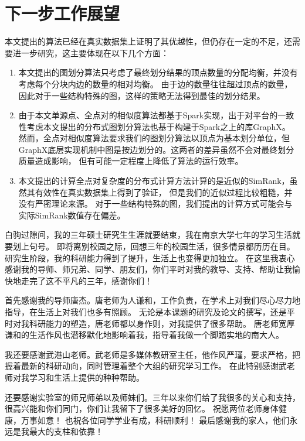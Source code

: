 \documentclass[master]{njuthesis}
\begin{document}
\section{下一步工作展望}
本文提出的算法已经在真实数据集上证明了其优越性，但仍存在一定的不足，还需要进一步研究，这主要体现在以下几个方面：
\begin{enumerate}
 \item 本文提出的图划分算法只考虑了最终划分结果的顶点数量的分配均衡，并没有考虑每个分块内边的数量的相对均衡。
 由于边的数量往往超过顶点的数量，因此对于一些结构特殊的图，这样的策略无法得到最佳的划分结果。
 \item 由于本文单源点、全点对的相似度算法都基于Spark实现，出于对平台的一致性考虑本文提出的分布式图划分算法也基于构建于Spark之上的库GraphX。
 然而，全点对相似度算法要求我们的图划分算法以顶点为基本划分单位，但GraphX底层实现机制中图是按边划分的。这两者的差异虽然不会对最终划分质量造成影响，
 但有可能一定程度上降低了算法的运行效率。
 \item 本文提出的计算全点对复杂度的分布式计算方法计算的是近似的SimRank，虽然其有效性在真实数据集上得到了验证，
 但是我们的近似过程比较粗糙，并没有严密理论来源。 对于一些结构特殊的图，我们提出的计算方式可能会与实际SimRank数值存在偏差。
 
\end{enumerate}



\begin{acknowledgement}
白驹过隙间，我的三年硕士研究生生涯就要结束，我在南京大学七年的学习生活就要划上句号。
即将离别校园之际，回想三年的校园生活，很多情景都历历在目。
研究生阶段，我的科研能力得到了提升，生活上也变得更加独立。
在这里我衷心感谢我的导师、师兄弟、同学、朋友们，你们平时对我的教导、支持、帮助让我愉快地走完了这不平凡的三年，感谢你们！

首先感谢我的导师唐杰。唐老师为人谦和，工作负责，在学术上对我们尽心尽力地指导，在生活上对我们也多有照顾。
无论是本课题的研究及论文的撰写，还是平时对我科研能力的塑造，唐老师都以身作则，对我提供了很多帮助。
唐老师宽厚谦和的生活作风也潜移默化地影响着我，指导着我做一个脚踏实地的南大人。

我还要感谢武港山老师。武老师是多媒体教研室主任，他作风严瑾，要求严格，把握着最新的科研动向，同时管理着整个大组的研究学习工作。
在此特别感谢武老师对我学习和生活上提供的种种帮助。

还要感谢实验室的师兄师弟以及师妹们。三年以来你们给了我很多的关心和支持，很高兴能和你们同门，你们让我留下了很多美好的回忆。
祝愿两位老师身体健康，万事如意！ 也祝各位同学学业有成，科研顺利！
最后感谢我的家人，他们永远是我最大的支柱和依靠！

\end{acknowledgement}
\end{document}
